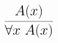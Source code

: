 \documentclass[14pt,border=2pt]{standalone}
\begin{document}
        $$
        \LARGE 

\begin{prooftree}
\hypo{A(x)}
\infer1{\forall x~ A(x)}
\end{prooftree}
        $$
        
\end{document}
